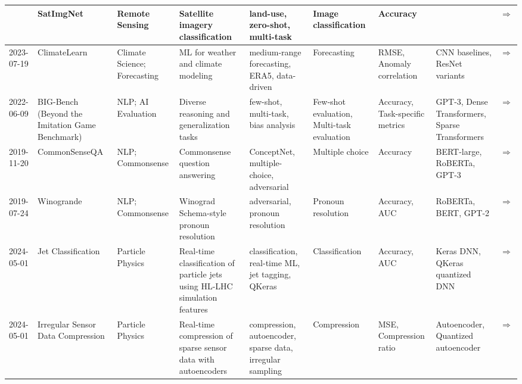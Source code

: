 \documentclass{article}
\begin{document}
\begin{landscape}
\begin{longtable}{|p{2cm}|p{2cm}|p{2cm}|p{2cm}|p{2cm}|p{2cm}|p{2cm}|p{2cm}|p{2cm}|}
 & SatImgNet & Remote Sensing & Satellite imagery classification & land-use, zero-shot, multi-task & Image classification & Accuracy &  & \cite{roberts2023satinmultitaskmetadatasetclassifying}\href{https://arxiv.org/abs/2304.11619}{$\Rightarrow$} \\ \hline
2023-07-19 & ClimateLearn & Climate Science; Forecasting & ML for weather and climate modeling & medium-range forecasting, ERA5, data-driven & Forecasting & RMSE, Anomaly correlation & CNN baselines, ResNet variants & \cite{nguyen2023climatelearnbenchmarkingmachinelearning}\href{https://arxiv.org/abs/2307.01909}{$\Rightarrow$} \\ \hline
2022-06-09 & BIG-Bench (Beyond the Imitation Game Benchmark) & NLP; AI Evaluation & Diverse reasoning and generalization tasks & few-shot, multi-task, bias analysis & Few-shot evaluation, Multi-task evaluation & Accuracy, Task-specific metrics & GPT-3, Dense Transformers, Sparse Transformers & \cite{srivastava2023imitationgamequantifyingextrapolating}\href{https://github.com/google/BIG-bench}{$\Rightarrow$} \\ \hline
2019-11-20 & CommonSenseQA & NLP; Commonsense & Commonsense question answering & ConceptNet, multiple-choice, adversarial & Multiple choice & Accuracy & BERT-large, RoBERTa, GPT-3 & \cite{talmor2019commonsenseqaquestionansweringchallenge}\href{https://paperswithcode.com/paper/commonsenseqa-a-question-answering-challenge}{$\Rightarrow$} \\ \hline
2019-07-24 & Winogrande & NLP; Commonsense & Winograd Schema-style pronoun resolution & adversarial, pronoun resolution & Pronoun resolution & Accuracy, AUC & RoBERTa, BERT, GPT-2 & \cite{sakaguchi2019winograndeadversarialwinogradschema}\href{https://leaderboard.allenai.org/winogrande/submissions/public}{$\Rightarrow$} \\ \hline
2024-05-01 & Jet Classification & Particle Physics & Real-time classification of particle jets using HL-LHC simulation features & classification, real-time ML, jet tagging, QKeras & Classification & Accuracy, AUC & Keras DNN, QKeras quantized DNN & \cite{hawks2022fastml}\href{https://github.com/fastmachinelearning/fastml-science/tree/main/jet-classify}{$\Rightarrow$} \\ \hline
2024-05-01 & Irregular Sensor Data Compression & Particle Physics & Real-time compression of sparse sensor data with autoencoders & compression, autoencoder, sparse data, irregular sampling & Compression & MSE, Compression ratio & Autoencoder, Quantized autoencoder & \cite{hawks2022fastml2}\href{https://github.com/fastmachinelearning/fastml-science/tree/main/sensor-data-compression}{$\Rightarrow$} \\ \hline

\end{longtable}
\end{landscape}
\end{document}
